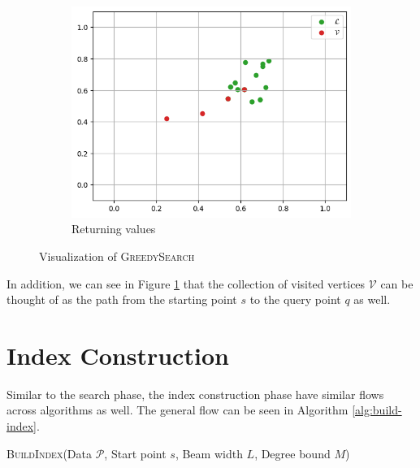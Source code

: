 \begin{figure}[ht]
\begin{subfigure}{0.31\textwidth}
        \includegraphics[width=\textwidth]{images/greedy-search-final}
        \caption{Returning values}
    \end{subfigure}
    \hfill
    \caption{Visualization of \textsc{GreedySearch}}
    \label{fig:greedy-viz}
\end{figure}

In addition, we can see in Figure \ref{fig:greedy-viz} that the collection of visited vertices \(\mathcal{V}\) can be thought of as the path from the starting point \(s\) to the query point \(q\) as well.

\section{Index Construction}

Similar to the search phase, the index construction phase have similar flows across algorithms as well. The general flow can be seen in Algorithm \ref{alg:build-index}.

\begin{algorithm}[H]
    \caption{\textsc{BuildIndex}(Data \(\mathcal{P}\), Start point \(s\), Beam width \(L\), Degree bound \(M\))}
    \label{alg:build-index}
    \begin{algorithmic}[1]
             
        \EndFor
    \end{algorithmic}
\end{algorithm}

